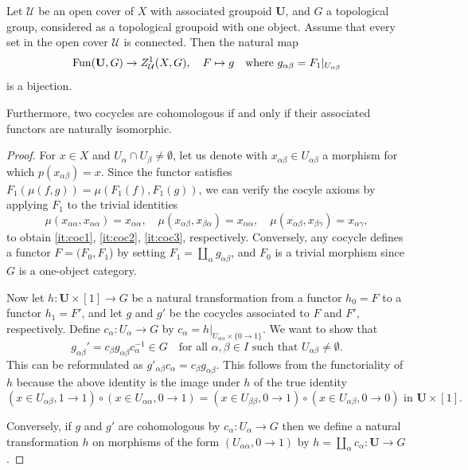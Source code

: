 \documentclass[a4paper,openany]{scrbook}
\begin{document}
\begin{prop} \label{prop:cocyclesasgroupoidmaps}
Let $\mathcal U$ be an open cover of $X$ with associated groupoid $\mathbf U$, and $G$ a topological group, considered as a topological groupoid with one object. Assume that every set in the open cover $\mathcal U$ is connected. Then the natural map
\[
\operatorname{Fun}(\mathbf U,G) \to Z^1_{\mathcal U}(X,G), \quad F \mapsto g \quad \text{where } g_{\alpha\beta} = F_1|_{U_{\alpha\beta}}
\]
is a bijection.

Furthermore, two cocycles are cohomologous if and only if their associated functors are naturally isomorphic.
\end{prop}
\begin{proof}
  For $x\in X$ and $U_{\alpha} \cap U_{\beta} \neq \emptyset $, let us denote with $x_{\alpha\beta} \in U_{\alpha\beta}$ a morphism for which $p(x_{\alpha\beta})=x$.
  Since the functor satisfies $F_1(\mu(f,g)) = \mu(F_1(f),F_1(g))$, we can verify the cocyle axioms by applying $F_1$ to the trivial identities 
  \[ 
      \mu(x_{\alpha\alpha},x_{\alpha\alpha}) = x_{\alpha\alpha},  \quad \mu(x_{\alpha\beta},x_{\beta\alpha}) = x_{\alpha\alpha}, \quad \mu(x_{\alpha\beta},x_{\beta\gamma}) = x_{\alpha\gamma}, 
  \] 
  to obtain \ref{it:coc1}, \ref{it:coc2}, \ref{it:coc3}, respectively.
  Conversely, any cocycle defines a functor $F=(F_0,F_1$) by setting $F_1=\coprod_{\alpha} g_{\alpha\beta}$, and $F_0$ is a trivial morphism since $G$ is a one-object category. 

  Now let $h\colon \mathbf U \times [1] \to G$ be a natural transformation from a functor $h_0=F$ to a functor $h_1=F'$, and let $g$ and $g'$ be the cocycles associated to $F$ and $F'$, respectively. Define $c_\alpha\colon U_\alpha \to G$ by $c_\alpha = h|_{U_{\alpha\alpha} \times \{0\to 1\} }$. We want to show that
\[
g_{\alpha\beta}' = c_\beta g_{\alpha\beta} c_\alpha^{-1} \in G \quad \text{for all } \alpha,\beta \in I \text{ such that } U_{\alpha\beta} \neq \emptyset.
\]
This can be reformulated as $g'_{\alpha\beta}c_\alpha = c_\beta g_{\alpha\beta}$. This follows from the functoriality of $h$ because the above identity is the image under $h$ of the true identity
\[
(x \in U_{\alpha\beta},1 \to 1) \circ (x \in U_{\alpha\alpha},0 \to 1) = (x \in U_{\beta\beta},0\to 1) \circ (x \in U_{\alpha\beta},0 \to 0) \text{ in } \mathbf U \times [1].
\]

Conversely, if $g$ and $g'$ are cohomologous by $c_\alpha\colon U_\alpha \to G$ then we define a natural transformation $h$ on morphisms of the form $(U_{\alpha\alpha}, 0 \to 1 )$ by $ h= \coprod_{\alpha}c_{\alpha}\colon \mathbf U \to G$.
\end{proof}
\end{document}
